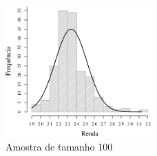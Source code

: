 \begin{figure}[h]
\centering
	\includegraphics[width=0.50\textwidth]{plots/histogram_renda_n100.eps}
	\caption{Amostra de tamanho 100}
	\label{fig:m100}
\end{figure}

\FloatBarrier
